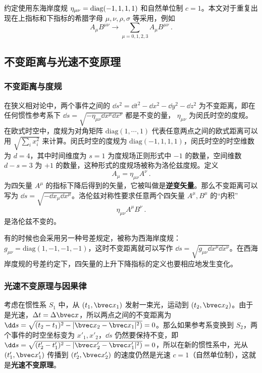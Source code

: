 

约定使用东海岸度规 $\eta_{\mu\nu}=\rm{diag}(-1,1,1,1)$ 和自然单位制 $c=1$。本文对于重复出现在上指标和下指标的希腊字母 $\mu,\nu,\rho,\sigma$ 等采用，例如
\begin{equation}
A_\mu B^{\mu\nu}\rightarrow \sum_{\mu=0,1,2,3}A_\mu B^{\mu\nu} ~.
\end{equation}

\subsection{不变距离与光速不变原理}
\subsubsection{不变距离与度规}
在狭义相对论中，两个事件之间的 $\dd s^2=\dd t^2-\dd x^2-\dd y^2-\dd z^2$ 为不变距离，即在任何惯性参考系下 $\dd s=\sqrt{-\eta_{\mu\nu}\dd x^\mu \dd x^\nu}$ 都是不变的量， $\eta_{\mu\nu}$ 为闵氏时空的度规。 在欧式时空中，度规为对角矩阵 $\mathrm{diag}(1,\cdots,1)$ 代表任意两点之间的欧式距离可以用 $\sqrt{\sum_i x_i^2}$ 来计算。闵氏时空的度规为 $\mathrm{diag}(-1,1,1,1)$，闵氏时空的时空维数为 $d=4$，其中时间维度为 $s=1$ 为度规场正则形式中 $-1$ 的数量，空间维数 $d-s=3$ 为 $+1$ 的数量，这种形式的度规场被称为洛伦兹度规。定义
\begin{equation}
A_\mu = \eta_{\mu\nu}A^\nu~.
\end{equation}
为四矢量 $A^\mu$ 的指标下降后得到的矢量，它被叫做是\textbf{逆变矢量}。那么不变距离可以写为 $\dd s=\sqrt{-\dd x_\mu \dd x^\mu}$。洛伦兹对称性要求任意两个四矢量 $A^\mu, B^\mu$ 的“内积”
\begin{equation}
\eta_{\mu\nu} A^\mu B^\nu~.
\end{equation}
是洛伦兹不变的。

有的时候也会采用另一种号差规定，被称为西海岸度规： $g_{\mu\nu}=\mathrm{diag}(1,-1,-1,-1)$，这时不变距离就可以写作 $\dd s = \sqrt{g_{\mu\nu}\dd x^\mu \dd x^\nu}$。在西海岸度规的号差约定下，四矢量的上升下降指标的定义也要相应地发生变化。
\subsubsection{光速不变原理与因果律}

考虑在惯性系 $S_1$ 中，从 $(t_1,\bvec x_1)$ 发射一束光，运动到 $(t_2,\bvec x_2)$。由于是光速，$\Delta t=\Delta \bvec x$，所以两点之间的不变距离为 $\dd s=\sqrt{(t_2-t_1)^2-|\bvec x_2-\bvec x_1|^2)}=0$。那么如果参考系变换到 $S_2$，两个事件的时空坐标变为 $x'_1,x'_2$，$\dd s$ 仍然要保持不变，即 $\dd s=\sqrt{(t'_2-t'_1)^2-|\bvec x'_2-\bvec x'_1|^2)}=0$，所以在新的惯性系中，光从 $(t'_1,\bvec x'_1)$ 传播到 $(t'_2,\bvec x'_2)$ 的速度仍然是光速 $c=1$（自然单位制），这就是\textbf{光速不变原理}。

